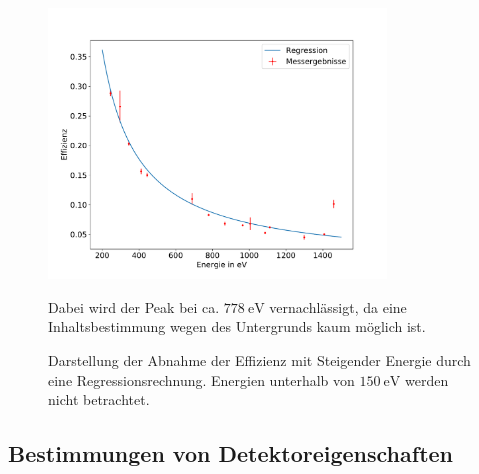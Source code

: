 \begin{figure}
\centering
\includegraphics[width=0.8\textwidth]{python/plots/effizienz.pdf}
\caption{Darstellung der Abnahme der Effizienz mit Steigender Energie durch eine Regressionsrechnung. Energien unterhalb von $\SI{150}{\electronvolt}$ werden nicht betrachtet.}
Dabei wird der Peak bei ca. $\SI{778}{\electronvolt}$ vernachlässigt, da eine Inhaltsbestimmung wegen des Untergrunds kaum möglich ist.
\label{fig:Effizienz}
\end{figure}
\subsection{Bestimmungen von Detektoreigenschaften}
\label{subsec:a2}






